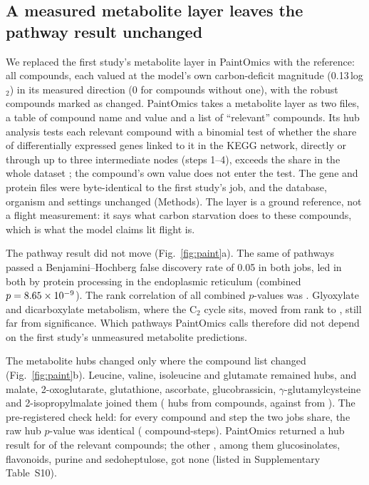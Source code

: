 \documentclass{npjlayout}
\begin{document}
\subsection{A measured metabolite layer leaves the pathway result unchanged}

We replaced the first study's metabolite layer in PaintOmics with the reference: all \nLayer{}
compounds, each valued at the model's own carbon-deficit magnitude (0.13\,log$_2$) in its measured
direction (0 for compounds without one), with the \nLayerRelevant{} robust compounds marked as
changed. PaintOmics takes a metabolite layer as two files, a table of compound name and value and a
list of ``relevant'' compounds. Its hub analysis tests each relevant compound with a binomial test of
whether the share of differentially expressed genes linked to it in the KEGG network, directly or
through up to three intermediate nodes (steps 1--4), exceeds the share in the whole dataset
\citep{paintomics4}; the compound's own value does not enter the test. The gene and protein files
were byte-identical to the first study's job, and the database, organism and settings unchanged
(Methods). The layer is a ground reference, not a flight measurement: it says what carbon
starvation does to these compounds, which is what the model claims lit flight is.

The pathway result did not move (Fig.~\ref{fig:paint}a). The same \nPathA{} of \nPathTotal{}
pathways passed a Benjamini--Hochberg false discovery rate \citep{bh1995} of 0.05 in both jobs, led
in both by protein processing in the endoplasmic reticulum (combined $p = 8.65\times10^{-9}$). The rank
correlation of all combined $p$-values was \rhoOneA{}. Glyoxylate and dicarboxylate metabolism,
where the C$_2$ cycle sits, moved from rank \rankGlyOne{} to \rankGlyA{}, still far from
significance. Which pathways PaintOmics calls therefore did not depend on the first study's
unmeasured metabolite predictions.

The metabolite hubs changed only where the compound list changed (Fig.~\ref{fig:paint}b). Leucine,
valine, isoleucine and glutamate remained hubs, and malate, 2-oxoglutarate, glutathione,
ascorbate, glucobrassicin, $\gamma$-glutamylcysteine and 2-isopropylmalate joined them
(\nHubA{} hubs from \nHubTestedA{} compounds, against \nHubOne{} from \nHubTestedOne). The
pre-registered check held: for every compound and step the two jobs share, the raw hub $p$-value was
identical (\nSharedHubSteps{} compound-steps). PaintOmics returned a hub result for
\nRelevantTested{} of the \nLayerRelevant{} relevant compounds; the other \nRelevantNoHub, among them
glucosinolates, flavonoids, purine and sedoheptulose, got none (listed in Supplementary Table~S10).
\end{document}
